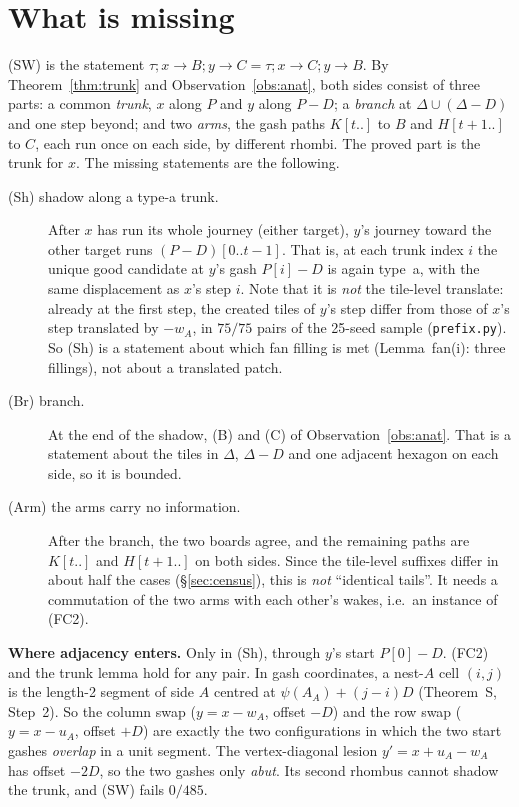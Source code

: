 \documentclass[11pt]{article}
\theoremstyle{definition}\newtheorem{definition}[theorem]{Definition}\newtheorem{remark}[theorem]{Remark}
\newcommand{\toB}{\!\to\! B}\newcommand{\toC}{\!\to\! C}\newcommand{\fa}{\mathfrak a}
\begin{document}
\section{What is missing}\label{sec:gap}
(SW) is the statement $\tau;x\toB;y\toC=\tau;x\toC;y\toB$. By Theorem~\ref{thm:trunk} and Observation~\ref{obs:anat}, both sides
consist of three parts: a common \emph{trunk}, $x$ along $P$ and $y$ along $P-D$; a \emph{branch} at $\Delta\cup(\Delta-D)$ and one
step beyond; and two \emph{arms}, the gash paths $K[t..]$ to $B$ and $H[t+1..]$ to $C$, each run once on each side, by different
rhombi. The proved part is the trunk for $x$. The missing statements are the following.
\begin{description}
\item[(Sh) shadow along a type-a trunk.] After $x$ has run its whole journey (either target), $y$'s journey toward the other target
runs $(P-D)[0..t-1]$. That is, at each trunk index $i$ the unique good candidate at $y$'s gash $P[i]-D$ is again type~a, with the same
displacement as $x$'s step $i$. Note that it is \emph{not} the tile-level translate: already at the first step, the created tiles of $y$'s step differ from
those of $x$'s step translated by $-w_A$, in $75/75$ pairs of the 25-seed sample (\texttt{prefix.py}). So (Sh) is a statement about which fan filling is met
(Lemma~fan(i): three fillings), not about a translated patch.
\item[(Br) branch.] At the end of the shadow, (B) and (C) of Observation~\ref{obs:anat}. That is a statement about the tiles in
$\Delta$, $\Delta-D$ and one adjacent hexagon on each side, so it is bounded.
\item[(Arm) the arms carry no information.] After the branch, the two boards agree, and the remaining paths are $K[t..]$ and
$H[t+1..]$ on both sides. Since the tile-level suffixes differ in about half the cases (\S\ref{sec:census}), this is \emph{not}
``identical tails''. It needs a commutation of the two arms with each other's wakes, i.e.\ an instance of (FC2).
\end{description}
\textbf{Where adjacency enters.} Only in (Sh), through $y$'s start $P[0]-D$. (FC2) and the trunk lemma hold for any pair. In gash
coordinates, a nest-$A$ cell $(i,j)$ is the length-2 segment of side $A$ centred at $\psi(A_A)+(j-i)D$ (Theorem~S, Step~2). So the column
swap ($y=x-w_A$, offset $-D$) and the row swap ($y=x-u_A$, offset $+D$) are exactly the two configurations in which the two start gashes
\emph{overlap} in a unit segment. The vertex-diagonal lesion $y'=x+u_A-w_A$ has offset $-2D$, so the two gashes only \emph{abut}. Its
second rhombus cannot shadow the trunk, and (SW) fails $0/485$.
\end{document}
